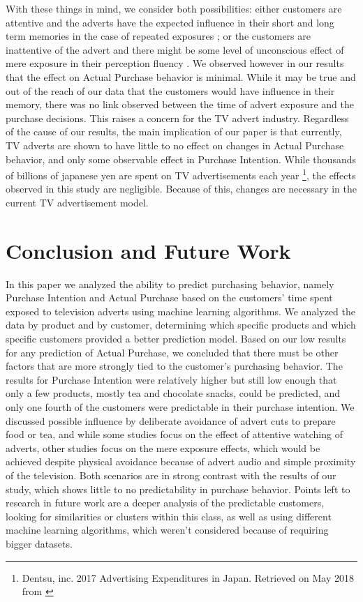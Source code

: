 \documentclass[review]{elsarticle}
\begin{document}
With these things in mind, we consider both possibilities: either customers are attentive and the adverts have the expected influence in their short and long term memories in the case of repeated exposures \cite{23}; or the customers are inattentive of the advert and there might be some level of unconscious effect of mere exposure in their perception fluency \cite{14}. We observed however in our results that the effect on Actual Purchase behavior is minimal. While it may be true and out of the reach of our data that the customers would have influence in their memory, there was no link observed between the time of advert exposure and the purchase decisions. This raises a concern for the TV advert industry. Regardless of the cause of our results, the main implication of our paper is that currently, TV adverts are shown to have little to no effect on changes in Actual Purchase behavior, and only some observable effect in Purchase Intention. While thousands of billions of japanese yen are spent on TV advertisements each year \footnote{\label{dentsu}Dentsu, inc. 2017 Advertising Expenditures in Japan. Retrieved on May 2018 from \href {http://www.dentsu.com/knowledgeanddata/ad_expenditures/pdf/expenditures_2017.pdf}{}}, the effects observed in this study are negligible. Because of this, changes are necessary in the current TV advertisement model.

\section{Conclusion and Future Work}
\label{conclusion}

In this paper we analyzed the ability to predict purchasing behavior, namely Purchase Intention and Actual Purchase based on the customers' time spent exposed to television adverts using machine learning algorithms. We analyzed the data by product and by customer, determining which specific products and which specific customers provided a better prediction model. Based on our low results for any prediction of Actual Purchase, we concluded that there must be other factors that are more strongly tied to the customer's purchasing behavior. The results for Purchase Intention were relatively higher but still low enough that only a few products, mostly tea and chocolate snacks, could be predicted, and only one fourth of the customers were predictable in their purchase intention. We discussed possible influence by deliberate avoidance of advert cuts to prepare food or tea, and while some studies focus on the effect of attentive watching of adverts, other studies focus on the mere exposure effects, which would be achieved despite physical avoidance because of advert audio and simple proximity of the television. Both scenarios are in strong contrast with the results of our study, which shows little to no predictability in purchase behavior. Points left to research in future work are a deeper analysis of the predictable customers, looking for similarities or clusters within this class, as well as using different machine learning algorithms, which weren't considered because of requiring bigger datasets. 
\end{document}
